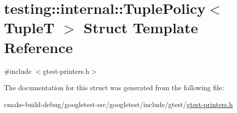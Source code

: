 \hypertarget{structtesting_1_1internal_1_1TuplePolicy}{}\section{testing\+::internal\+::Tuple\+Policy$<$ TupleT $>$ Struct Template Reference}
\label{structtesting_1_1internal_1_1TuplePolicy}


{\ttfamily \#include $<$gtest-\/printers.\+h$>$}



The documentation for this struct was generated from the following file\+:\begin{DoxyCompactItemize}
\item 
cmake-\/build-\/debug/googletest-\/src/googletest/include/gtest/\mbox{\hyperlink{gtest-printers_8h}{gtest-\/printers.\+h}}\end{DoxyCompactItemize}
